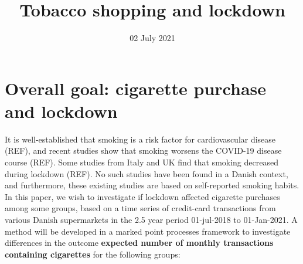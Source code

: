 \documentclass[
  11pt,
]{article}
\title{Tobacco shopping and lockdown}
\author{}
\date{\vspace{-2.5em}\small 02 July 2021}
\begin{document}
\maketitle

\hypertarget{overall-goal-cigarette-purchase-and-lockdown}{%
\section{Overall goal: cigarette purchase and
lockdown}\label{overall-goal-cigarette-purchase-and-lockdown}}

It is well-established that smoking is a risk factor for cardiovascular
disease (REF), and recent studies show that smoking worsens the COVID-19
disease course (REF). Some studies from Italy and UK find that smoking
decreased during lockdown (REF). No such studies have been found in a
Danish context, and furthermore, these existing studies are based on
self-reported smoking habits. In this paper, we wish to investigate if
lockdown affected cigarette purchases among some groups, based on a time
series of credit-card transactions from various Danish supermarkets in
the 2.5 year period 01-jul-2018 to 01-Jan-2021. A method will be
developed in a marked point processes framework to investigate
differences in the outcome \textbf{expected number of monthly
transactions containing cigarettes} for the following groups:
\end{document}
